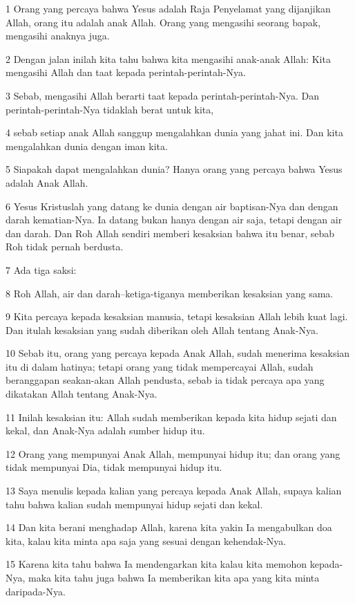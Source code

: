 \par 1 Orang yang percaya bahwa Yesus adalah Raja Penyelamat yang dijanjikan Allah, orang itu adalah anak Allah. Orang yang mengasihi seorang bapak, mengasihi anaknya juga.
\par 2 Dengan jalan inilah kita tahu bahwa kita mengasihi anak-anak Allah: Kita mengasihi Allah dan taat kepada perintah-perintah-Nya.
\par 3 Sebab, mengasihi Allah berarti taat kepada perintah-perintah-Nya. Dan perintah-perintah-Nya tidaklah berat untuk kita,
\par 4 sebab setiap anak Allah sanggup mengalahkan dunia yang jahat ini. Dan kita mengalahkan dunia dengan iman kita.
\par 5 Siapakah dapat mengalahkan dunia? Hanya orang yang percaya bahwa Yesus adalah Anak Allah.
\par 6 Yesus Kristuslah yang datang ke dunia dengan air baptisan-Nya dan dengan darah kematian-Nya. Ia datang bukan hanya dengan air saja, tetapi dengan air dan darah. Dan Roh Allah sendiri memberi kesaksian bahwa itu benar, sebab Roh tidak pernah berdusta.
\par 7 Ada tiga saksi:
\par 8 Roh Allah, air dan darah--ketiga-tiganya memberikan kesaksian yang sama.
\par 9 Kita percaya kepada kesaksian manusia, tetapi kesaksian Allah lebih kuat lagi. Dan itulah kesaksian yang sudah diberikan oleh Allah tentang Anak-Nya.
\par 10 Sebab itu, orang yang percaya kepada Anak Allah, sudah menerima kesaksian itu di dalam hatinya; tetapi orang yang tidak mempercayai Allah, sudah beranggapan seakan-akan Allah pendusta, sebab ia tidak percaya apa yang dikatakan Allah tentang Anak-Nya.
\par 11 Inilah kesaksian itu: Allah sudah memberikan kepada kita hidup sejati dan kekal, dan Anak-Nya adalah sumber hidup itu.
\par 12 Orang yang mempunyai Anak Allah, mempunyai hidup itu; dan orang yang tidak mempunyai Dia, tidak mempunyai hidup itu.
\par 13 Saya menulis kepada kalian yang percaya kepada Anak Allah, supaya kalian tahu bahwa kalian sudah mempunyai hidup sejati dan kekal.
\par 14 Dan kita berani menghadap Allah, karena kita yakin Ia mengabulkan doa kita, kalau kita minta apa saja yang sesuai dengan kehendak-Nya.
\par 15 Karena kita tahu bahwa Ia mendengarkan kita kalau kita memohon kepada-Nya, maka kita tahu juga bahwa Ia memberikan kita apa yang kita minta daripada-Nya.
